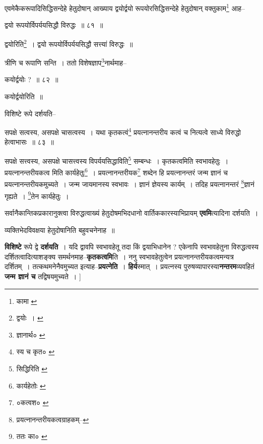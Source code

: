 \documentclass[article,12pt,a4paper]{memoir}
\begin{document}
	  \pstart एवमेकैकरूपादिसिद्धिसन्देहे हेतुदोषान् आख्याय द्वयोर्द्वयो रूपयोरसिद्धिसन्देहे हेतुदोषान् वक्तुकाम\footnote{कामा \cite{dp-msC}} आह--
	\pend
       
	  \bigskip
	  \begingroup
	

	  \pstart द्वयो रूपयोर्विपर्ययसिद्धौ विरुद्धः ॥ ८१ ॥
	\pend
      
	  \endgroup
	 

	  \pstart द्वयोरिति\footnote{द्वयोः । \cite{dp-msD}} । द्वयो रूपयोर्विपर्ययसिद्धौ सत्त्यां विरुद्धः ॥
	\pend
       

	  \pstart त्रीणि च रूपाणि सन्ति । ततो विशेषज्ञाप\footnote{ज्ञानार्थ० \cite{dp-msC}}नार्थमाह--
	\pend
       
	  \bigskip
	  \begingroup
	

	  \pstart कयोर्द्वयोः ? ॥ ८२ ॥
	\pend
      
	  \endgroup
	 

	  \pstart कयोर्द्वयोरिति ॥
	\pend
       

	  \pstart विशिष्टे रूपे दर्शयति--
	\pend
       
	  \bigskip
	  \begingroup
	

	  \pstart सपक्षे सत्वस्य, असपक्षे चासत्वस्य । यथा कृतकत्वं\footnote{स्य च कृत० \cite{dp-msC}} प्रयत्नानन्तरीय कत्वं च नित्यत्वे साध्ये विरुद्धो हेत्वाभासः ॥ ८३ ॥
	\pend
      
	  \endgroup
	 

	  \pstart सपक्षे सत्त्वस्य, असपक्षे चासत्त्वस्य विपर्ययसिद्धाविति\footnote{सिद्धिरिति \cite{dp-msC}} सम्बन्धः । कृतकत्वमिति स्वभावहेतुः । प्रयत्नानन्तरीयकत्व मिति कार्यहेतुः\footnote{कार्यहेतोः \cite{dp-edH}} । प्रयत्नानन्तरीयक\footnote{०कत्वश० \cite{dp-msC}} शब्देन हि प्रयत्नानन्तरं जन्म ज्ञानं च प्रयत्नानन्तरीयकमुच्यते । जन्म जायमानस्य स्वभावः । ज्ञानं ज्ञेयस्य कार्यम् । तदिह प्रयत्नानन्तरं \footnote{प्रयत्नानन्तरीयकत्वग्राहकम्--\cite{dp-msD-n}}ज्ञानं गृह्यते । \footnote{ततः का० \cite{dp-msC} \cite{dp-msD}}तेन कार्यहेतुः ।
	\pend
      
	  \endgroup
	

	  \pstart सर्वानैकान्तिकप्रकारानुक्त्वा विरुद्धत्वाख्यं हेतुदोषमभिदधानो वार्तिककारस्याभिप्रायम् \textbf{एवमि}त्यादिना दर्शयति ।
	\pend
      

	  \pstart व्यक्तिभेदविवक्षया हेतुदोषानिति बहुवचनेनाह ॥
	\pend
      

	  \pstart \textbf{विशिष्टे} रूपे द्वे \textbf{दर्शयति} । यदि द्वावपि स्वभावहेतू तदा किं द्वयाभिधानेन ? एकेनापि स्वभावहेतुना विरुद्धत्वस्य दर्शितत्वादित्याशङ्क्य समर्थनमाह--\textbf{कृतकत्वमि}ति । ननु स्वभावहेतुत्वेन प्रयत्नानन्तरीयकत्वमन्यत्र दर्शितम् । तत्कथमनेनैवमुच्यत इत्याह--\textbf{प्रयत्नेति} । \textbf{हिर्य}स्मात् । प्रयत्नस्य पुरुषव्यापारस्या\textbf{नन्तरम}व्यवहितं \textbf{जन्म ज्ञानं च} तद्विषयमुच्यते ।
	\pend
      [[चेति \cite{dp-msC}]]\leavevmode{}
	  \bigskip
	  \begingroup
	
\end{document}

